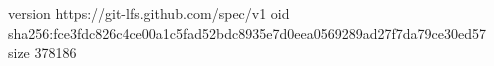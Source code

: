 version https://git-lfs.github.com/spec/v1
oid sha256:fce3fdc826c4ce00a1c5fad52bdc8935e7d0eea0569289ad27f7da79ce30ed57
size 378186
